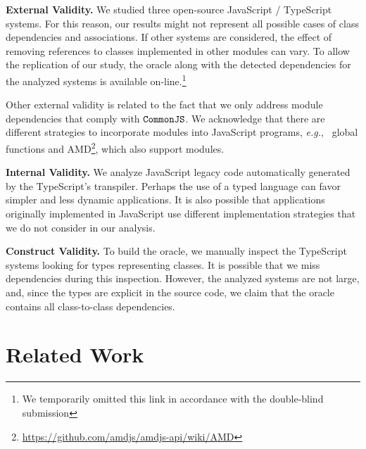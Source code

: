 \documentclass[review]{elsarticle}
\newcommand{\mcode}[1]{$\tt #1$}
\begin{document}
\noindent \textbf{External Validity.} We studied three open-source JavaScript / TypeScript systems. For this reason, our results might not represent all possible cases of class dependencies and associations. If other systems are considered, the effect of removing references to classes implemented in other modules can vary. To allow the replication of our study, the oracle along with the detected dependencies for the analyzed systems is available on-line.\footnote{We temporarily omitted this link in accordance with the double-blind submission}

Other external validity is related to the fact that we only address module dependencies that comply with \mcode{CommonJS}. We acknowledge that there are different strategies to incorporate modules into JavaScript programs, \emph{e.g.},~ global functions and AMD\footnote{\url{https://github.com/amdjs/amdjs-api/wiki/AMD}}, which also support modules.

\vspace{1.5 mm}

\noindent \textbf{Internal Validity.} We analyze JavaScript legacy code automatically generated by the TypeScript's transpiler. Perhaps the use of a typed language can favor simpler and less dynamic applications. It is also possible that applications originally implemented in JavaScript use different implementation strategies that we do not consider in our analysis. 

\vspace{1.5 mm}

\noindent \textbf{Construct Validity.} To build the oracle, we manually inspect the TypeScript systems looking for types representing classes. It is possible that we miss dependencies during this inspection. However, the analyzed systems are not large, and, since the types are explicit in the source code, we claim that the oracle contains all class-to-class dependencies.  



\section{Related Work}
\label{sec:related-work}
\end{document}
